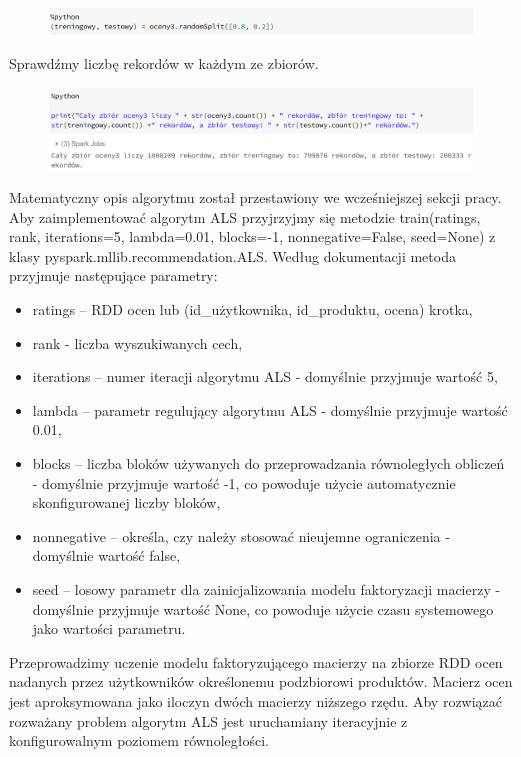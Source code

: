 \documentclass[12pt,a4paper]{report}
\begin{document}
\begin{figure}[H]
\includegraphics[scale=0.5]{obrazy/ALS6.PNG} 
\end{figure}

Sprawdźmy liczbę rekordów w każdym ze zbiorów.

\begin{figure}[H]
\includegraphics[scale=0.5]{obrazy/ALS7.PNG} 
\end{figure}

Matematyczny opis algorytmu został przestawiony we wcześniejszej sekcji pracy.
Aby zaimplementować algorytm ALS przyjrzyjmy się metodzie train(ratings, rank, iterations=5, lambda=0.01, blocks=-1, nonnegative=False, seed=None) z klasy pyspark.mllib.recommendation.ALS. Według dokumentacji metoda przyjmuje następujące parametry:
\begin{itemize}
\item ratings – RDD ocen lub (id\_użytkownika, id\_produktu, ocena) krotka,
\item rank - liczba wyszukiwanych cech,
\item iterations – numer iteracji algorytmu ALS - domyślnie przyjmuje wartość 5,
\item lambda – parametr regulujący algorytmu ALS - domyślnie przyjmuje wartość 0.01,
\item blocks – liczba bloków używanych do przeprowadzania równoległych obliczeń - domyślnie przyjmuje wartość -1, co powoduje użycie automatycznie skonfigurowanej liczby bloków,
\item nonnegative – określa, czy należy stosować nieujemne ograniczenia - domyślnie wartość false,
\item seed – losowy parametr dla zainicjalizowania modelu faktoryzacji macierzy - domyślnie przyjmuje wartość None, co powoduje użycie czasu systemowego jako wartości parametru.
\end{itemize}

Przeprowadzimy uczenie modelu faktoryzującego macierzy na zbiorze RDD ocen nadanych przez użytkowników określonemu podzbiorowi produktów. Macierz ocen jest aproksymowana jako iloczyn dwóch macierzy niższego rzędu. Aby rozwiązać rozważany problem algorytm ALS jest uruchamiany iteracyjnie z konfigurowalnym poziomem równoległości.
\end{document}
